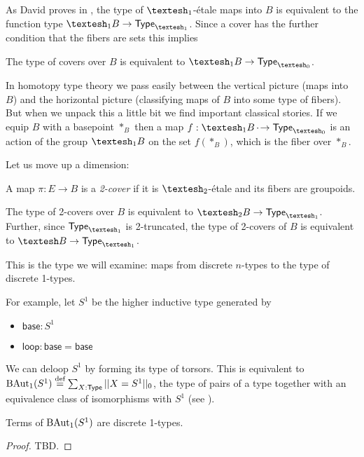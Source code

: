 \documentclass[12pt]{article}
\begin{document}
As David proves in \cite{myersgood}, the type of \(\shapeo\)-étale maps into \(B\) is equivalent to the function type \(\shapeo B \to \Typeo\). Since a cover has the further condition that the fibers are sets this implies

\begin{mylemma}
  The type of covers over \(B\) is equivalent to \(\shapeo B \to \Type_{\shapez}\).
\end{mylemma}

In homotopy type theory we pass easily between the vertical picture (maps into \(B\)) and the horizontal picture (classifying maps of \(B\) into some type of fibers). But when we unpack this a little bit we find important classical stories. If we equip \(B\) with a basepoint \(*_B\) then a map \(f:\shapeo B \dotto \Type_{\shapez}\) is an action of the group \(\shapeo B\) on the set \(f(*_B)\), which is the fiber over \(*_B\).

Let us move up a dimension:

\begin{mydef}
  A map \(\pi:E\to B\) is a \emph{2-cover} if it is \(\shapet\)-étale and its fibers are groupoids.
\end{mydef}

\begin{mylemma}
  The type of 2-covers over \(B\) is equivalent to \(\shapet B \to \Typeo\). Further, since \(\Typeo\) is 2-truncated, the type of 2-covers of \(B\) is equivalent to \(\shape B\to \Typeo\).
\end{mylemma}

This is the type we will examine: maps from discrete \( n \)-types to the type of discrete 1-types.

For example, let \(S^1\) be the higher inductive type generated by
\begin{itemize}
\item \( \mathsf{base}:S^1 \)
\item \( \mathsf{loop}:\mathsf{base}=\mathsf{base} \)
\end{itemize}

We can deloop \(S^1\) by forming its type of torsors. This is equivalent to \(\mathrm{BAut}_1(S^1)\stackrel{\textup{def}}{=}\sum_{X:\mathsf{Type}}||X=S^1||_0\), the type of pairs of a type together with an equivalence class of isomorphisms with \( S^1 \) (see \cite{buchholtz2023central}). 

\begin{mylemma}Terms of \( \mathrm{BAut}_1(S^1) \) are discrete 1-types.\end{mylemma}\begin{proof} TBD.\end{proof}
\end{document}
